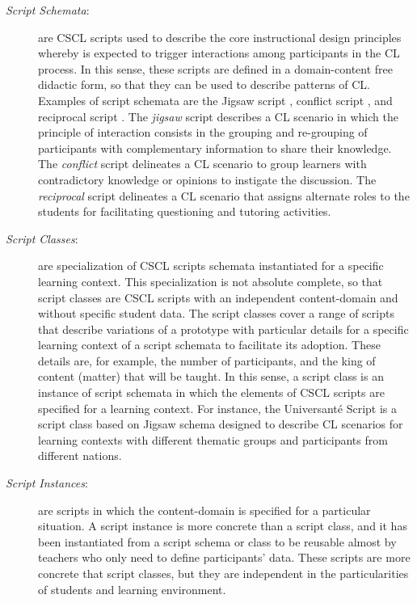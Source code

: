\begin{description}
\item[\emph{Script Schemata}:] are CSCL scripts used to describe the core instructional design principles whereby is expected to trigger interactions among participants in the CL process.
In this sense, these scripts are defined in a domain-content free didactic form, so that they can be used to describe patterns of CL.
Examples of script schemata are the Jigsaw script \cite{Aronson1978, KordakiSiempos2010}, conflict script \cite{WeinbergerErtlFischerMandl2005}, and reciprocal script \cite{King2007}.
The \emph{jigsaw} script describes a CL scenario in which the principle of interaction consists in the grouping and re-grouping of participants with complementary information to share their knowledge.
The \emph{conflict} script delineates a CL scenario to group learners with contradictory knowledge or opinions to instigate the discussion.
The \emph{reciprocal} script delineates a CL scenario that assigns alternate roles to the students for facilitating questioning and tutoring activities.

\item[\emph{Script Classes}:] are specialization of CSCL scripts schemata instantiated for a specific learning context.
This specialization is not absolute complete, so that script classes are CSCL scripts with an independent content-domain and without specific student data.
The script classes cover a range of scripts that describe variations of a prototype with particular details for a specific learning context of a script schemata to facilitate its adoption.
These details are, for example, the number of participants, and the king of content (matter) that will be taught.
In this sense, a script class is an instance of script schemata in which the elements of CSCL scripts are specified for a learning context.
For instance, the Universanté Script \cite{DillenbourgJermann2007} is a script class based on Jigsaw schema designed to describe CL scenarios for learning contexts with different thematic groups and participants from different nations.

\item[\emph{Script Instances}:] are scripts in which the content-domain is specified for a particular situation.
A script instance is more concrete than a script class, and it has been instantiated from a script schema or class to be reusable almost by teachers who only need to define participants' data.
These scripts are more concrete that script classes, but they are independent in the particularities of students and learning environment.


\end{description}
